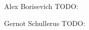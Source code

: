 \documentclass[journal]{IEEEtran}
\begin{document}
\ifCLASSOPTIONcaptionsoff
  \newpage
\fi
        



\begin{IEEEbiography}{Alex Borisevich}
TODO:

\end{IEEEbiography}


\begin{IEEEbiography}{Gernot Schullerus}
TODO:

\end{IEEEbiography}
\end{document}
